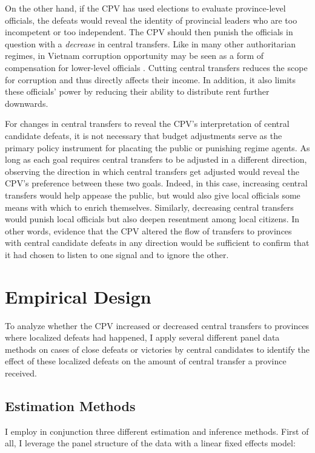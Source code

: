 \documentclass[12pt]{article}
\newcommand{\1}{\mathbbm{1}}
\begin{document}
On the other hand, if the CPV has used elections to evaluate province-level officials, the defeats would reveal the identity of provincial leaders who are too incompetent or too independent. The CPV should then punish the officials in question with a \textit{decrease} in central transfers. Like in many other authoritarian regimes, in Vietnam corruption opportunity may be seen as a form of compensation for lower-level officials \citep{Darden2008}. Cutting central transfers reduces the scope for corruption and thus directly affects their income. In addition, it also limits these officials' power by reducing their ability to distribute rent further downwards.

For changes in central transfers to reveal the CPV's interpretation of central candidate defeats, it is not necessary that budget adjustments serve as the primary policy instrument for placating the public or punishing regime agents. As long as each goal requires central transfers to be adjusted in a different direction, observing the direction in which central transfers get adjusted would reveal the CPV's preference between these two goals. Indeed, in this case, increasing central transfers would help appease the public, but would also give local officials some means with which to enrich themselves. Similarly, decreasing central transfers would punish local officials but also deepen resentment among local citizens. In other words, evidence that the CPV altered the flow of transfers to provinces with central candidate defeats in any direction would be sufficient to confirm that it had chosen to listen to one signal and to ignore the other.

\section{Empirical Design}
\label{sec:methods}

To analyze whether the CPV increased or decreased central transfers to provinces where localized defeats had happened, I apply several different panel data methods on cases of close defeats or victories by central candidates to identify the effect of these localized defeats on the amount of central transfer a province received.

\subsection{Estimation Methods}
\label{sec:methods_estimation}
I employ in conjunction three different estimation and inference methods. First of all, I leverage the panel structure of the data with a linear fixed effects model:
\end{document}
